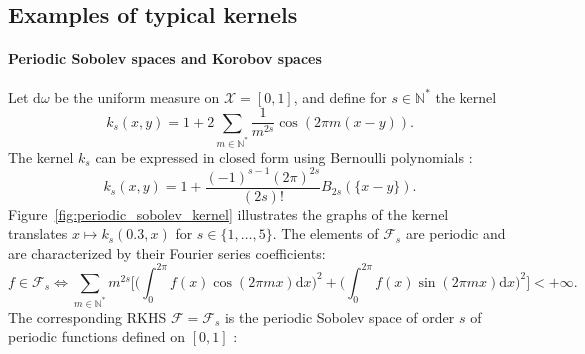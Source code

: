 \documentclass[twoside,11pt]{book}
\numberwithin{theorem}{chapter}
\numberwithin{definition}{chapter}
\numberwithin{proposition}{chapter}
\numberwithin{corollary}{chapter}
\numberwithin{example}{chapter}
\numberwithin{lemma}{chapter}
\begin{document}
\subsection{Examples of typical kernels}
\label{subsec:kernel_examples}
\paragraph{Periodic Sobolev spaces and Korobov spaces}




Let $\mathrm{d}\omega$ be the uniform measure on $\mathcal{X} = [0,1]$, and define for $s \in \mathbb{N}^{*}$ the kernel
\begin{equation}
k_{s}(x,y) = 1+ 2\sum\limits_{m \in \mathbb{N}^{*}} \frac{1}{m^{2s}} \cos(2\pi m(x-y)).
\end{equation}
The kernel $k_{s}$ can be expressed in closed form using Bernoulli polynomials \cite{Wah90}:
\begin{equation}
k_{s}(x,y) = 1 + \frac{(-1)^{s-1}(2 \pi)^{2s}}{(2s)!} B_{2s}(\{x-y\}).
\end{equation}
Figure~\ref{fig:periodic_sobolev_kernel} illustrates the graphs of the kernel translates $x \mapsto k_{s}(0.3,x)$ for $s \in \{1, \dots, 5\}$. The elements of $\mathcal{F}_{s}$ are periodic and are characterized by their Fourier series coefficients:
\begin{equation}
f \in \mathcal{F}_{s} \iff \sum\limits_{m \in \mathbb{N}^{*}} m^{2s} \bigg[\big( \int_{0}^{2\pi} f(x)\cos (2 \pi m x) \mathrm{d}x \big)^{2} + \big( \int_{0}^{2\pi} f(x)\sin (2 \pi m x) \mathrm{d}x \big)^{2} \bigg] <+\infty .
\end{equation}
The corresponding RKHS $\mathcal{F}=\mathcal{F}_{s}$ is the periodic Sobolev space of order $s$ of periodic functions defined on $[0,1]$ \citep{BeTh11}:
\end{document}
